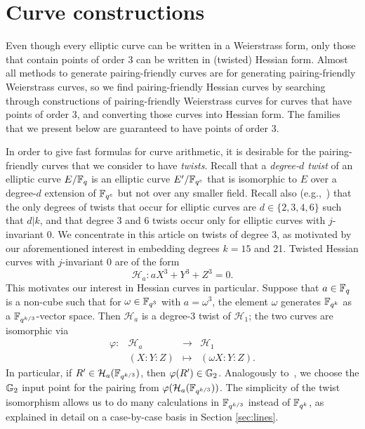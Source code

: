 \section{Curve constructions}
\label{sec:curves}

Even though every elliptic curve can be written in a Weierstrass form,
only those that contain points of order 3 can be written in (twisted) Hessian form.
Almost all methods to generate pairing-friendly curves are for generating
pairing-friendly Weierstrass curves, 
so we find pairing-friendly Hessian curves by
searching through constructions of pairing-friendly Weierstrass curves for curves that have points of order 3,
and converting those curves into Hessian form.
The families that we present below are guaranteed to have points of order 3.

In order to give fast formulas for curve arithmetic, it is desirable for the pairing-friendly curves that we consider to have \emph{twists}.
Recall that a \emph{degree-$d$ twist} of an elliptic curve $E/\mathbb{F}_{q}$ is an elliptic curve $E'/\mathbb{F}_{q^e}$ that is
isomorphic to $E$ over a degree-$d$ extension of $\mathbb{F}_{q^e}$ but not over any smaller field.
Recall also (e.g.,~\cite{2009/silverman-arithmetic}) that the only degrees of twists that occur for elliptic curves are $d \in \{2,3,4,6\}$ such that $d|k$, and that degree 3 and 6 twists occur only for elliptic curves with $j$-invariant 0.
We concentrate in this article on twists of degree 3, as motivated by our aforementioned interest in embedding degrees $k = 15$ and 21.
Twisted Hessian curves with $j$-invariant 0 are of the form
\[\mathcal{H}_a: aX^3 + Y^3 + Z^3 = 0.\]
This motivates our interest in Hessian curves in particular.
Suppose that $a \in \mathbb{F}_{q}$ is a non-cube such that
for $\omega \in \mathbb{F}_{q^3}$ with $a = \omega^3$, the element
$\omega$ generates $\mathbb{F}_{q^k}$ as a $\mathbb{F}_{q^{k/3}}$-vector space.
Then $\mathcal{H}_{a}$ is a degree-3 twist of $\mathcal{H}_1$; the two curves are isomorphic via
\begin{equation}\label{twistiso}
\begin{array}{rccc}
\varphi: & \mathcal{H}_{a} & \rightarrow & \mathcal{H}_1 \\
& (X:Y:Z) & \mapsto & (\omega X:Y:Z).
\end{array}
\end{equation}
In particular, if $R' \in \mathcal{H}_{a}(\mathbb{F}_{q^{k/3}})$, then
$\varphi(R') \in \mathbb{G}_{2}$.
Analogously to~\cite{2003/bls}, we choose the $\mathbb{G}_{2}$ input point for the pairing
from $\varphi(\mathcal{H}_{a}(\mathbb{F}_{q^{k/3}}))$.
The simplicity of the twist isomorphism 
allows us to do many calculations in $\mathbb{F}_{q^{k/3}}$ instead of $\mathbb{F}_{q^k}$,
as explained in detail on a case-by-case basis in Section \ref{sec:lines}.

